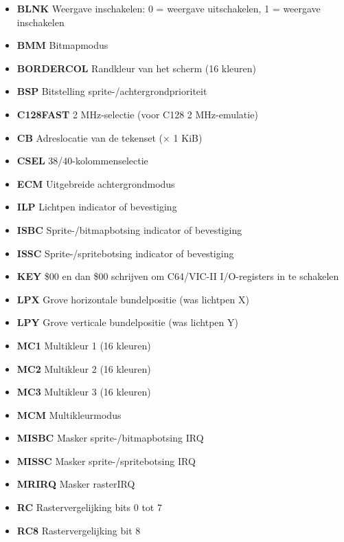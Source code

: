 \begin{itemize}
\item{\bf{BLNK}} Weergave inschakelen: 0 = weergave uitschakelen, 1 = weergave inschakelen
\item{\bf{BMM}} Bitmapmodus
\item{\bf{BORDERCOL}} Randkleur van het scherm (16 kleuren)
\item{\bf{BSP}} Bitstelling sprite-/achtergrondprioriteit
\item{\bf{C128FAST}} 2 MHz-selectie (voor C128 2 MHz-emulatie)
\item{\bf{CB}} Adreslocatie van de tekenset (× 1 KiB)
\item{\bf{CSEL}} 38/40-kolommenselectie
\item{\bf{ECM}} Uitgebreide achtergrondmodus
\item{\bf{ILP}} Lichtpen indicator of bevestiging
\item{\bf{ISBC}} Sprite-/bitmapbotsing indicator of bevestiging
\item{\bf{ISSC}} Sprite-/spritebotsing indicator of bevestiging
\item{\bf{KEY}} \$00 en dan \$00 schrijven om C64/VIC-II I/O-registers in te schakelen
\item{\bf{LPX}} Grove horizontale bundelpositie (was lichtpen X)
\item{\bf{LPY}} Grove verticale bundelpositie (was lichtpen Y)
\item{\bf{MC1}} Multikleur 1 (16 kleuren)
\item{\bf{MC2}} Multikleur 2 (16 kleuren)
\item{\bf{MC3}} Multikleur 3 (16 kleuren)
\item{\bf{MCM}} Multikleurmodus
\item{\bf{MISBC}} Masker sprite-/bitmapbotsing IRQ
\item{\bf{MISSC}} Masker sprite-/spritebotsing IRQ
\item{\bf{MRIRQ}} Masker rasterIRQ
\item{\bf{RC}} Rastervergelijking bits 0 tot 7
\item{\bf{RC8}} Rastervergelijking bit 8

\end{itemize}
